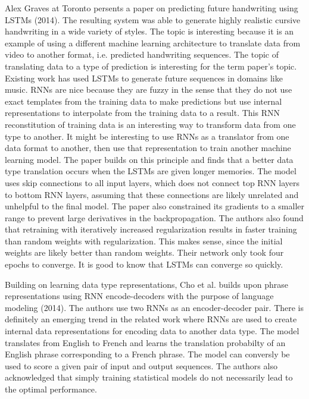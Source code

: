Alex Graves at Toronto persents a paper on predicting future handwriting using LSTMs (2014).  The resulting system was able to generate highly realistic cursive handwriting in a wide variety of styles.  The topic is interesting because it is an example of using a different machine learning architecture to translate data from video to another format, i.e. predicted handwriting sequences.  The topic of translating data to a type of prediction is interesting for the term paper's topic.  Existing work has used LSTMs to generate future sequences in domains like music.  RNNs are nice because they are fuzzy in the sense that they do not use exact templates from the training data to make predictions but use internal representations to interpolate from the training data to a result.  This RNN reconstitution of training data is an interesting way to transform data from one type to another.  It might be interesting to use RNNs as a translator from one data format to another, then use that representation to train another machine learning model.  The paper builds on this principle and finds that a better data type translation occurs when the LSTMs are given longer memories.  The model uses skip connections to all input layers, which does not connect top RNN layers to bottom RNN layers, assuming that these connections are likely unrelated and unhelpful to the final model.  The paper also constrained its gradients to a smaller range to prevent large derivatives in the backpropagation.  The authors also found that retraining with iteratively increased regularization results in faster training than random weights with regularization.  This makes sense, since the initial weights are likely better than random weights.  Their network only took four epochs to converge.  It is good to know that LSTMs can converge so quickly.

Building on learning data type representations, Cho et al. builds upon phrase representations using RNN encode-decoders with the purpose of language modeling (2014).  The authors use two RNNs as an encoder-decoder pair.  There is definitely an emerging trend in the related work where RNNs are used to create internal data representations for encoding data to another data type.  The model translates from English to French and learns the translation probabilty of an English phrase corresponding to a French phrase.  The model can conversly be used to score a given pair of input and output sequences. The authors also acknowledged that simply training statistical models do not necessarily lead to the optimal performance.

